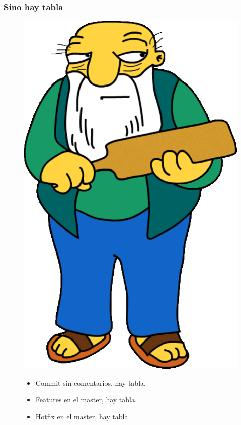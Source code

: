 \documentclass{beamer}
\begin{document}
\begin{frame}[fragile]\frametitle{Sino hay tabla}
	\begin{figure}
		\begin{minipage}{0.3\textwidth}
			\includegraphics[scale=0.15,left]{80a.png}
		\end{minipage}
	\begin{minipage}{0.68\textwidth}\raggedright
    \begin{itemize}
      \item Commit sin comentarios, hay tabla.
	  \item Features en el master, hay tabla.
	  \item Hotfix en el master, hay tabla.	  

\end{itemize}
\end{minipage}
\end{figure}
\end{frame}
\end{document}
